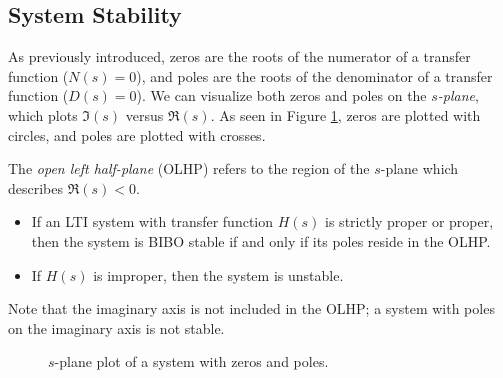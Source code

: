 \documentclass{report}
\begin{document}
\subsection{System Stability}
As previously introduced, zeros are the roots of the numerator of a transfer function ($N(s)=0$), and poles are the roots of the denominator of a transfer function ($D(s)=0$). 
We can visualize both zeros and poles on the \emph{$s$-plane}, which plots $\Im(s)$ versus $\Re(s)$. As seen in Figure \ref{s_plane}, zeros are plotted with circles, and poles are plotted with crosses.
\begin{tcolorbox}[width=\textwidth,colback={white}, sharp corners]
    The \emph{open left half-plane} (OLHP) refers to the region of the $s$-plane which describes $\Re(s)<0$. 
    \begin{itemize}
        \item If an LTI system with transfer function $H(s)$ is strictly proper or proper, then the system is BIBO stable if and only if its poles reside in the OLHP.
        \item If $H(s)$ is improper, then the system is unstable.
    \end{itemize}
\end{tcolorbox}
Note that the imaginary axis is not included in the OLHP; a system with poles on the imaginary axis is not stable.

\begin{figure}[!hbt]
    \caption{$s$-plane plot of a system with zeros and poles.}
    \label{s_plane}
    \centering
\end{figure}
\end{document}
